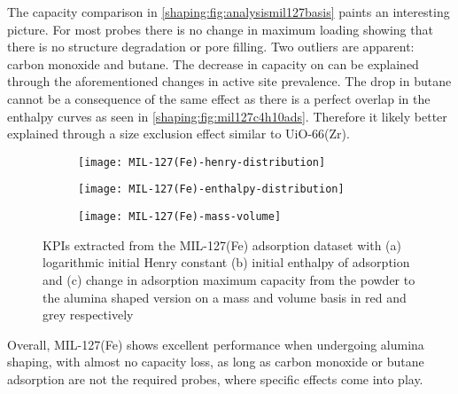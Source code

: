 The capacity comparison in \autoref{shaping:fig:analysismil127basis}
paints an interesting picture. For most probes there is no change in
maximum loading showing that there is no structure degradation or
pore filling. Two outliers are apparent: carbon monoxide and
butane. The decrease in capacity on  can be explained through the
aforementioned changes in active site prevalence.
The drop in butane cannot be a consequence of the same effect
as there is a perfect overlap in the enthalpy curves as seen in
\autoref{shaping:fig:mil127c4h10ads}.
Therefore it likely better explained through a size exclusion
effect similar to UiO-66(Zr).

\begin{figure}[p!]
	\centering
	\begin{subfigure}{\linewidth}
		\parbox[c]{0.1\linewidth}{\caption{}%
			\label{shaping:fig:analysismil127henry}}%
		\parbox[b]{0.8\linewidth}{%
			\texttt{[image: MIL-127(Fe)-henry-distribution]}%
		}%
	\end{subfigure}%

	\begin{subfigure}{\linewidth}
		\parbox[c]{0.1\linewidth}{\caption{}%
			\label{shaping:fig:analysismil127enth}}%
		\parbox[b]{0.8\linewidth}{%
			\texttt{[image: MIL-127(Fe)-enthalpy-distribution]}%
		}%
	\end{subfigure}%

	\begin{subfigure}{\linewidth}
		\parbox[c]{0.1\linewidth}{\caption{}%
			\label{shaping:fig:analysismil127basis}}%
		\parbox[b]{0.8\linewidth}{%
			\texttt{[image: MIL-127(Fe)-mass-volume]}%
		}%
	\end{subfigure}%

	\caption{\glspl{KPI} extracted from the MIL-127(Fe) adsorption dataset with
		(a) logarithmic initial Henry constant (b) initial enthalpy of
        adsorption and (c) change in adsorption maximum capacity from 
        the powder to the alumina shaped version on a mass and volume 
        basis in red and grey respectively}%
	\label{shaping:fig:analysismil127}
\end{figure}

Overall, MIL-127(Fe) shows excellent performance when undergoing
alumina shaping, with almost no capacity loss, as long as
carbon monoxide or butane adsorption are not the required probes,
where specific effects come into play.
